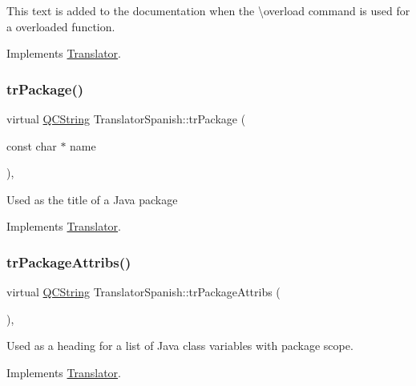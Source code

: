 This text is added to the documentation when the \textbackslash{}overload command is used for a overloaded function. 

Implements \mbox{\hyperlink{class_translator}{Translator}}.

\mbox{\label{class_translator_spanish_aa392b42f9cb14746b47cc2ff82c318a1}} 
\subsubsection{\texorpdfstring{trPackage()}{trPackage()}}
{\footnotesize\ttfamily virtual \mbox{\hyperlink{class_q_c_string}{Q\+C\+String}} Translator\+Spanish\+::tr\+Package (\begin{DoxyParamCaption}\item[{const char $\ast$}]{name }\end{DoxyParamCaption})\hspace{0.3cm}{\ttfamily [inline]}, {\ttfamily [virtual]}}

Used as the title of a Java package 

Implements \mbox{\hyperlink{class_translator}{Translator}}.

\mbox{\label{class_translator_spanish_af381fe89675060d4fba1faf347431ddf}} 
\subsubsection{\texorpdfstring{trPackageAttribs()}{trPackageAttribs()}}
{\footnotesize\ttfamily virtual \mbox{\hyperlink{class_q_c_string}{Q\+C\+String}} Translator\+Spanish\+::tr\+Package\+Attribs (\begin{DoxyParamCaption}{ }\end{DoxyParamCaption})\hspace{0.3cm}{\ttfamily [inline]}, {\ttfamily [virtual]}}

Used as a heading for a list of Java class variables with package scope. 

Implements \mbox{\hyperlink{class_translator}{Translator}}.

\mbox{\label{class_translator_spanish_a1fa17771c70c375d47ef082b709f952d}} 
